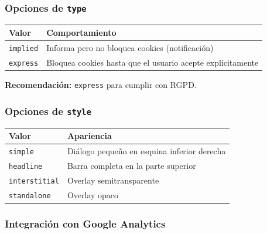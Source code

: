 \documentclass[
  doc,
  floatsintext,
  longtable,
  a4paper,
  nolmodern,
  notxfonts,
  notimes,
  12pt,
  colorlinks=true,linkcolor=blue,citecolor=blue,urlcolor=blue]{apa7}
\newcounter{none} %
\begin{document}
\subsubsection{\texorpdfstring{Opciones de
\texttt{type}}{Opciones de type}}\label{opciones-de-type-1}

{\def\LTcaptype{none} %
\begin{longtable}[]{@{}
  >{\raggedright\arraybackslash}p{}
  >{\raggedright\arraybackslash}p{}@{}}
\toprule\noalign{}
\begin{minipage}[b]{\linewidth}\raggedright
Valor
\end{minipage} & \begin{minipage}[b]{\linewidth}\raggedright
Comportamiento
\end{minipage} \\
\midrule\noalign{}
\endhead
\bottomrule\noalign{}
\endlastfoot
\texttt{implied} & Informa pero no bloquea cookies (notificación) \\
\texttt{express} & Bloquea cookies hasta que el usuario acepte
explícitamente \\
\end{longtable}
}

\textbf{Recomendación:} \texttt{express} para cumplir con RGPD.

\subsubsection{\texorpdfstring{Opciones de
\texttt{style}}{Opciones de style}}\label{opciones-de-style}

{\def\LTcaptype{none} %
\begin{longtable}[]{@{}ll@{}}
\toprule\noalign{}
Valor & Apariencia \\
\midrule\noalign{}
\endhead
\bottomrule\noalign{}
\endlastfoot
\texttt{simple} & Diálogo pequeño en esquina inferior derecha \\
\texttt{headline} & Barra completa en la parte superior \\
\texttt{interstitial} & Overlay semitransparente \\
\texttt{standalone} & Overlay opaco \\
\end{longtable}
}

\subsubsection{Integración con Google
Analytics}\label{integraciuxf3n-con-google-analytics}
\end{document}
